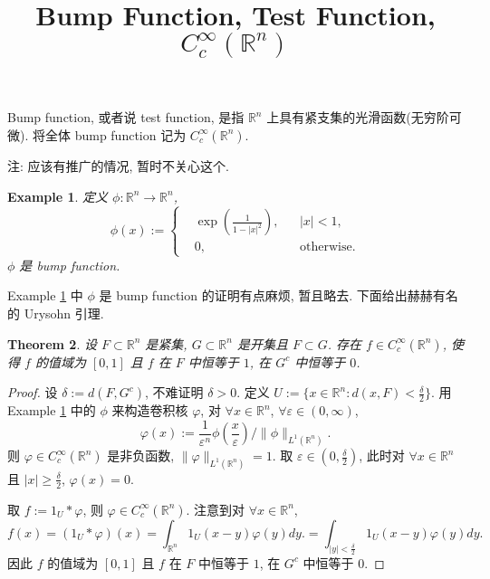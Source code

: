 \documentclass[a4paper,11pt]{article}
\title{Bump Function, Test Function, $C_c^\infty(\mathbb{R}^n)$}
\newtheorem{theorem}{Theorem}[section]
\newtheorem{example}[theorem]{Example}
\theoremstyle{definition}
\begin{document}
\maketitle

Bump function, 或者说 test function, 是指 $ \mathbb{R}^n $ 上具有紧支集的光滑函数(无穷阶可微). 
将全体 bump function 记为 $ C_c^\infty(\mathbb{R}^n) $.

注: 应该有推广的情况, 暂时不关心这个.

\begin{example} \label{ex1}
    定义 $ \phi : \mathbb{R}^n \to \mathbb{R}^n $,
    $$
        \phi(x) := \left\{
        \begin{aligned}
            &\exp \left( \frac{1}{1-|x|^2} \right), && |x| < 1, \\
            &0, & & \text{otherwise}.
        \end{aligned} \right. 
    $$
    $ \phi $ 是 bump function.
\end{example}

Example \ref{ex1} 中 $ \phi $ 是 bump function 的证明有点麻烦, 暂且略去. 
下面给出赫赫有名的 Urysohn 引理.

\begin{theorem}
    设 $ F \subset \mathbb{R}^n $ 是紧集, $ G \subset \mathbb{R}^n $ 是开集且 $ F \subset G $.
    存在 $ f \in C_c^\infty(\mathbb{R}^n) $, 使得
    $ f $ 的值域为 $ [0, 1] $ 且 $ f $ 在 $ F $ 中恒等于 $ 1 $, 在 $ G^c $ 中恒等于 $ 0 $.
\end{theorem}

\begin{proof}
    设 $ \delta := d(F, G^c) $, 不难证明 $ \delta > 0 $. 
    定义 $ U := \{x \in \mathbb{R}^n : d(x, F) < \frac{\delta}{2} \} $.
    用 Example \ref{ex1} 中的 $ \phi $ 来构造卷积核 $ \varphi $, 
    对 $ \forall x \in \mathbb{R}^n $, $ \forall \varepsilon \in (0, \infty) $, 
    $$ 
        \varphi(x) := \frac{1}{\varepsilon^n} \phi \left(\frac{x}{\varepsilon}\right) / \|\phi\|_{L^1(\mathbb{R}^n)}.
    $$
    则 $ \varphi \in C_c^\infty(\mathbb{R}^n) $ 是非负函数, $ \|\varphi\|_{L^1(\mathbb{R}^n)} = 1 $.
    取 $ \varepsilon \in (0, \frac{\delta}{2}) $, 
    此时对 $ \forall x \in \mathbb{R}^n $ 且 $ |x| \geq \frac{\delta}{2} $,
    $ \varphi(x) = 0 $.
    
    取 $ f := \mathrm{1}_{U} * \varphi $, 则 $ \varphi \in C_c^\infty(\mathbb{R}^n) $.
    注意到对 $ \forall x \in \mathbb{R}^n $,
    $$
        f(x) = (\mathrm{1}_{U} * \varphi) (x) 
             =  \int_{\mathbb{R}^n} \mathrm{1}_{U}(x - y) \varphi(y) dy.
             =  \int_{|y| < \frac{\delta}{2}} \mathrm{1}_{U}(x - y) \varphi(y) dy.
    $$
    因此 $ f $ 的值域为 $ [0, 1] $ 且 $ f $ 在 $ F $ 中恒等于 $ 1 $, 在 $ G^c $ 中恒等于 $ 0 $.
\end{proof}
\end{document}
